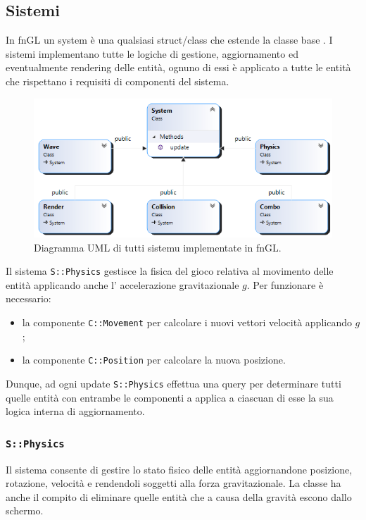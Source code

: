 \subsection{Sistemi}
In fnGL un system è una qualsiasi struct/class che estende la classe base . I sistemi implementano tutte le logiche di gestione, aggiornamento ed eventualmente rendering delle entità, ognuno di essi è applicato a tutte le entità che rispettano i requisiti di componenti del sistema.

\begin{figure}[!htp]
	\centering
	\includegraphics[width=0.95\linewidth]{images/ch20/8}
	\caption{Diagramma UML di tutti sistemu implementate in fnGL.}
	\label{fig:uml-system}
\end{figure}


\begin{exampleBox}
	Il sistema \texttt{S::Physics} gestisce la fisica del gioco relativa al movimento delle entità applicando anche l'{} accelerazione gravitazionale $g$. Per funzionare è necessario:
	\begin{itemize}
		\item la componente \texttt{C::Movement} per calcolare i nuovi vettori velocità applicando $g$;
		\item la componente \texttt{C::Position} per calcolare la nuova posizione.
	\end{itemize}
    Dunque, ad ogni update \texttt{S::Physics} effettua una query per determinare tutti quelle entità con entrambe le componenti a applica a ciascuan di esse la sua logica interna di aggiornamento.
\end{exampleBox}


\subsubsection{\texttt{S::Physics}}
Il sistema  consente di gestire lo stato fisico delle entità aggiornandone posizione, rotazione, velocità e rendendoli soggetti alla forza gravitazionale. La classe ha anche il compito di eliminare quelle entità che a causa della gravità escono dallo schermo. 

